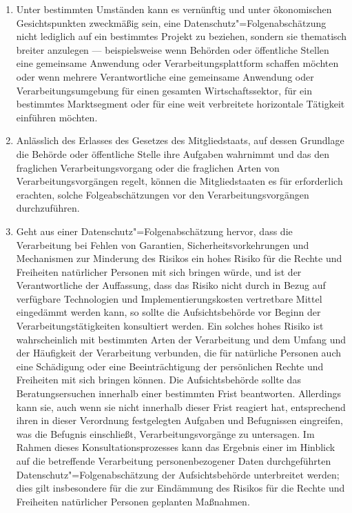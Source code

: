 \begin{enumerate}

   \item Unter bestimmten Umständen kann es vernünftig und unter ökonomischen Gesichtspunkten zweckmäßig sein, eine
    Datenschutz"=Folgenabschätzung nicht lediglich auf ein bestimmtes Projekt zu beziehen, sondern sie thematisch
    breiter anzulegen — beispielsweise wenn Behörden oder öffentliche Stellen eine gemeinsame Anwendung oder
    Verarbeitungsplattform schaffen möchten oder wenn mehrere Verantwortliche eine gemeinsame Anwendung oder
    Verarbeitungsumgebung für einen gesamten Wirtschaftssektor, für ein bestimmtes Marktsegment oder für eine weit
    verbreitete horizontale Tätigkeit einführen möchten.%
   \label{itm:eg-92}
   

   \item Anlässlich des Erlasses des Gesetzes des Mitgliedstaats, auf dessen Grundlage die Behörde oder öffentliche
    Stelle ihre Aufgaben wahrnimmt und das den fraglichen Verarbeitungsvorgang oder die fraglichen Arten von
    Verarbeitungsvorgängen regelt, können die Mitgliedstaaten es für erforderlich erachten, solche Folgeabschätzungen
    vor den Verarbeitungsvorgängen durchzuführen.%
   \label{itm:eg-93}
   

   \item Geht aus einer Datenschutz"=Folgenabschätzung hervor, dass die Verarbeitung bei Fehlen von Garantien,
    Sicherheitsvorkehrungen und Mechanismen zur Minderung des Risikos ein hohes Risiko für die Rechte und Freiheiten
    natürlicher Personen mit sich bringen würde, und ist der Verantwortliche der Auffassung, dass das Risiko nicht
    durch in Bezug auf verfügbare Technologien und Implementierungskosten vertretbare Mittel eingedämmt werden kann, so
    sollte die Aufsichtsbehörde vor Beginn der Verarbeitungstätigkeiten konsultiert werden. Ein solches hohes Risiko
    ist wahrscheinlich mit bestimmten Arten der Verarbeitung und dem Umfang und der Häufigkeit der Verarbeitung
    verbunden, die für natürliche Personen auch eine Schädigung oder eine Beeinträchtigung der persönlichen Rechte und
    Freiheiten mit sich bringen können. Die Aufsichtsbehörde sollte das Beratungsersuchen innerhalb einer bestimmten
    Frist beantworten. Allerdings kann sie, auch wenn sie nicht innerhalb dieser Frist reagiert hat, entsprechend ihren
    in dieser Verordnung festgelegten Aufgaben und Befugnissen eingreifen, was die Befugnis einschließt,
    Verarbeitungsvorgänge zu untersagen. Im Rahmen dieses Konsultationsprozesses kann das Ergebnis einer im Hinblick
    auf die betreffende Verarbeitung personenbezogener Daten durchgeführten Datenschutz"=Folgenabschätzung der
    Aufsichtsbehörde unterbreitet werden; dies gilt insbesondere für die zur Eindämmung des Risikos für die Rechte und
    Freiheiten natürlicher Personen geplanten Maßnahmen.%
   \label{itm:eg-94}
   

\end{enumerate}
